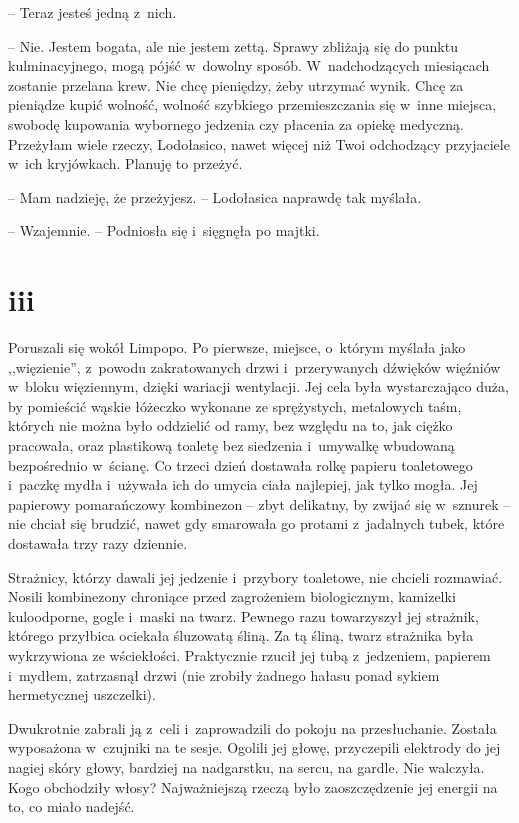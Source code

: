 \documentclass[oneside,polish,11pt,sfheadings]{mwbk}
\begin{document}
-- Teraz jesteś jedną z~nich.

-- Nie. Jestem bogata, ale nie jestem zettą. Sprawy zbliżają się do
punktu kulminacyjnego, mogą pójść w~dowolny sposób. W~nadchodzących
miesiącach zostanie przelana krew. Nie chcę pieniędzy, żeby utrzymać
wynik. Chcę za pieniądze kupić wolność, wolność szybkiego
przemieszczania się w~inne miejsca, swobodę kupowania wybornego jedzenia
czy płacenia za opiekę medyczną. Przeżyłam wiele rzeczy, Lodołasico,
nawet więcej niż Twoi odchodzący przyjaciele w~ich kryjówkach. Planuję
to przeżyć.

-- Mam nadzieję, że przeżyjesz. -- Lodołasica naprawdę tak myślała.

-- Wzajemnie. -- Podniosła się i~sięgnęła po majtki.

\chapter*{iii}
Poruszali się wokół Limpopo. Po pierwsze, miejsce, o~którym myślała jako
,,więzienie'', z~powodu zakratowanych drzwi i~przerywanych dźwięków
więźniów w~bloku więziennym, dzięki wariacji wentylacji. Jej cela była
wystarczająco duża, by pomieścić wąskie łóżeczko wykonane ze
sprężystych, metalowych taśm, których nie można było oddzielić od ramy,
bez względu na to, jak ciężko pracowała, oraz plastikową toaletę bez
siedzenia i~umywalkę wbudowaną bezpośrednio w~ścianę. Co trzeci dzień
dostawała rolkę papieru toaletowego i~paczkę mydła i~używała ich do
umycia ciała najlepiej, jak tylko mogła. Jej papierowy pomarańczowy
kombinezon -- zbyt delikatny, by zwijać się w~sznurek -- nie chciał się
brudzić, nawet gdy smarowała go protami z~jadalnych tubek, które
dostawała trzy razy dziennie.

Strażnicy, którzy dawali jej jedzenie i~przybory toaletowe, nie chcieli
rozmawiać. Nosili kombinezony chroniące przed zagrożeniem biologicznym,
kamizelki kuloodporne, gogle i~maski na twarz. Pewnego razu towarzyszył
jej strażnik, którego przyłbica ociekała śluzowatą śliną. Za tą śliną,
twarz strażnika była wykrzywiona ze wściekłości. Praktycznie rzucił jej
tubą z~jedzeniem, papierem i~mydłem, zatrzasnął drzwi (nie zrobiły
żadnego hałasu ponad sykiem hermetycznej uszczelki).

Dwukrotnie zabrali ją z~celi i~zaprowadzili do pokoju na przesłuchanie.
Została wyposażona w~czujniki na te sesje. Ogolili jej głowę,
przyczepili elektrody do jej nagiej skóry głowy, bardziej na nadgarstku,
na sercu, na gardle. Nie walczyła. Kogo obchodziły włosy? Najważniejszą
rzeczą było zaoszczędzenie jej energii na to, co miało nadejść.
\end{document}
